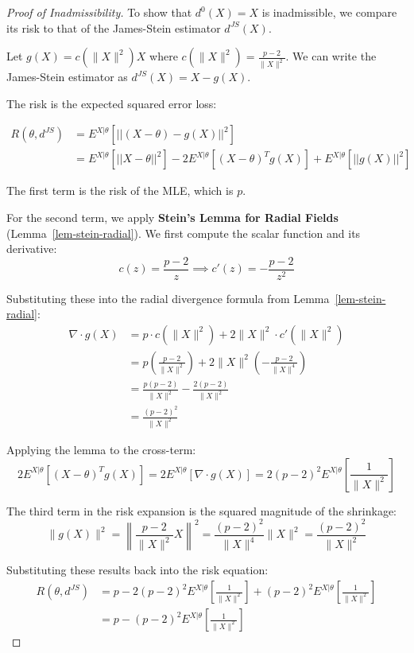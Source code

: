 \documentclass[
  letterpaper,
  DIV=11,
  numbers=noendperiod]{scrreprt}
\renewcommand{\[}{\begin{equation}}
\renewcommand{\]}{\end{equation}}
\theoremstyle{definition}
\theoremstyle{plain}
\theoremstyle{plain}
\theoremstyle{plain}
\theoremstyle{definition}
\theoremstyle{plain}
\theoremstyle{remark}
\begin{document}
\begin{proof}[Proof of Inadmissibility]
To show that \(d^0(X) = X\) is inadmissible, we compare its risk to that
of the James-Stein estimator \(d^{JS}(X)\).

Let \(g(X) = c(\lVert X \rVert^2)X\) where
\(c(\lVert X \rVert^2) = \frac{p-2}{\lVert X \rVert^2}\). We can write
the James-Stein estimator as \(d^{JS}(X) = X - g(X)\).

The risk is the expected squared error loss:

\[
\begin{aligned}
R(\theta, d^{JS}) &= E^{X|\theta} \left[ || (X - \theta) - g(X) ||^2 \right] \\
&= E^{X|\theta} \left[ ||X - \theta||^2 \right] - 2 E^{X|\theta} \left[ (X-\theta)^T g(X) \right] + E^{X|\theta} \left[ ||g(X)||^2 \right]
\end{aligned}
\]

The first term is the risk of the MLE, which is \(p\).

For the second term, we apply \textbf{Stein's Lemma for Radial Fields}
(Lemma~\ref{lem-stein-radial}). We first compute the scalar function and
its derivative:
\[c(z) = \frac{p-2}{z} \implies c'(z) = -\frac{p-2}{z^2}\]

Substituting these into the radial divergence formula from
Lemma~\ref{lem-stein-radial}: \[
\begin{aligned}
\nabla \cdot g(X) &= p \cdot c(\lVert X \rVert^2) + 2 \lVert X \rVert^2 \cdot c'(\lVert X \rVert^2) \\
&= p \left( \frac{p-2}{\lVert X \rVert^2} \right) + 2 \lVert X \rVert^2 \left( -\frac{p-2}{\lVert X \rVert^4} \right) \\
&= \frac{p(p-2)}{\lVert X \rVert^2} - \frac{2(p-2)}{\lVert X \rVert^2} \\
&= \frac{(p-2)^2}{\lVert X \rVert^2}
\end{aligned}
\]

Applying the lemma to the cross-term:
\[2 E^{X|\theta} \left[ (X-\theta)^T g(X) \right] = 2 E^{X|\theta} [ \nabla \cdot g(X) ] = 2(p-2)^2 E^{X|\theta} \left[ \frac{1}{\lVert X \rVert^2} \right]\]

The third term in the risk expansion is the squared magnitude of the
shrinkage:
\[\lVert g(X) \rVert^2 = \left\lVert \frac{p-2}{ \lVert X \rVert ^2} X \right \rVert^2 = \frac{(p-2)^2}{\lVert X \rVert^4} \lVert X \rVert^2 = \frac{(p-2)^2}{\lVert X \rVert^2}\]

Substituting these results back into the risk equation: \[
\begin{aligned}
R(\theta, d^{JS}) &= p - 2(p-2)^2 E^{X|\theta} \left[ \frac{1}{\lVert X \rVert^2} \right] + (p-2)^2 E^{X|\theta} \left[ \frac{1}{\lVert X \rVert^2} \right] \\
&= p - (p-2)^2 E^{X|\theta} \left[ \frac{1}{\lVert X \rVert^2} \right]
\end{aligned}
\]


\end{proof}
\end{document}
